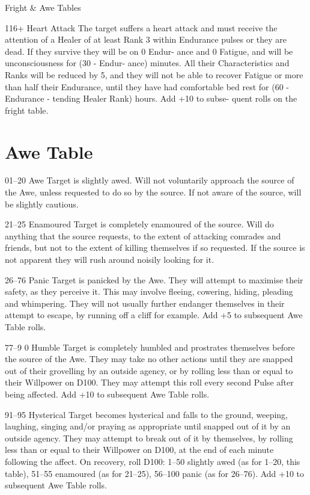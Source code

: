 \begin{Tables}{Fright \& Awe Tables}
\begin{Description}
\item[116+] Heart Attack The target suffers a heart attack and must
  receive the attention of a Healer of at least Rank 3 within
  Endurance pulses or they are dead. If they survive they will be on 0
  Endur- ance and 0 Fatigue, and will be unconsciousness for (30 -
  Endur- ance) minutes. All their Characteristics and Ranks will be
  reduced by 5, and they will not be able to recover Fatigue or more
  than half their Endurance, until they have had comfortable bed rest
  for (60 - Endurance - tending Healer Rank) hours. Add +10 to subse-
  quent rolls on the fright table.

\end{Description} 

\section{Awe Table}

\begin{Description}
\item[01–20] Awe Target is slightly awed. Will not voluntarily
  approach the source of the Awe, unless requested to do so by the
  source. If not aware of the source, will be slightly cautious.

\item[21–25] Enamoured Target is completely enamoured of the
  source. Will do anything that the source requests, to the extent of
  attacking comrades and friends, but not to the extent of killing
  themselves if so requested. If the source is not apparent they will
  rush around noisily looking for it.

\item[26–76] Panic Target is panicked by the Awe. They will attempt to
  maximise their safety, as they perceive it. This may involve
  fleeing, cowering, hiding, pleading and whimpering. They will not
  usually further endanger themselves in their attempt to escape, by
  running off a cliff for example. Add +5 to subsequent Awe Table
  rolls.

\item[77–9]0 Humble Target is completely humbled and prostrates
  themselves before the source of the Awe. They may take no other
  actions until they are snapped out of their grovelling by an outside
  agency, or by rolling less than or equal to their Willpower on
  D100. They may attempt this roll every second Pulse after being
  affected. Add +10 to subsequent Awe Table rolls.

91–95   Hysterical Target becomes hysterical and falls to the ground, 
weeping, laughing, singing and/or praying as appropriate until 
snapped out of it by an outside agency. They may attempt to 
break out of it by themselves, by rolling less than or equal to their 
Willpower on D100, at the end of each minute following the 
affect. On recovery, roll D100: 1–50 slightly awed (as for 1–20, 
this table), 51–55 enamoured (as for 21–25), 56–100 panic (as for 
26–76). Add +10 to subsequent Awe Table rolls. 


\end{Description}
\end{Tables}
